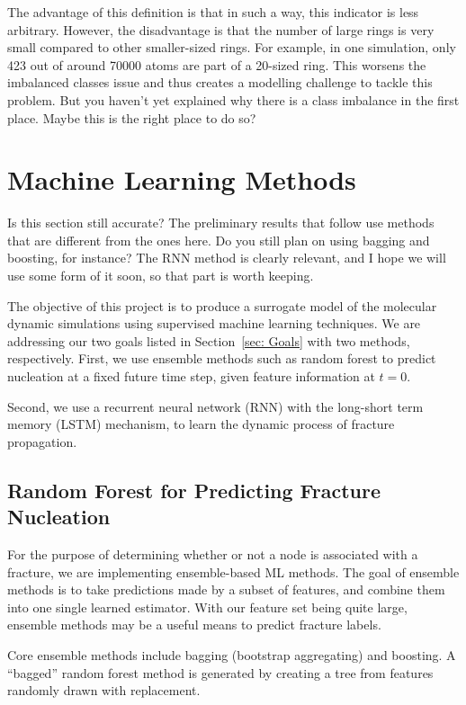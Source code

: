     The advantage of this definition is that in such a way, this indicator is less arbitrary. However, the disadvantage is that the number of large rings is very small compared to other smaller-sized rings. For example, in one simulation, only 423 out of around 70000 atoms are part of a 20-sized ring. This worsens the imbalanced classes issue and thus creates a modelling challenge to tackle this problem. {\color{red}But you haven't yet explained why there is a class imbalance in the first place.  Maybe this is the right place to do so?}



\section{Machine Learning Methods}

{\color{red}Is this section still accurate?  The preliminary results that follow use methods that are different from the ones here.  Do you still plan on using bagging and boosting, for instance?  The RNN method is clearly relevant, and I hope we will use some form of it soon, so that part is worth keeping.}

The objective of this project is to produce a surrogate model of the molecular dynamic simulations using supervised machine learning techniques. We are addressing our two goals listed in Section~\ref{sec: Goals} with two methods, respectively. First, we use ensemble methods such as random forest to predict nucleation at a fixed future time step, given feature information at $t=0$.

Second, we use a recurrent neural network (RNN) with the long-short term memory (LSTM) mechanism, to learn the dynamic process of fracture propagation.

\subsection{Random Forest for Predicting Fracture Nucleation}

For the purpose of determining whether or not a node is associated with a fracture, we are implementing ensemble-based ML methods. The goal of ensemble methods is to take predictions made by a subset of features, and combine them into one single learned estimator. With our feature set being quite large, ensemble methods may be a useful means to predict fracture labels. 

Core ensemble methods include bagging (bootstrap aggregating) and boosting. A ``bagged'' random forest method is generated by creating a tree from features randomly drawn with replacement. 

